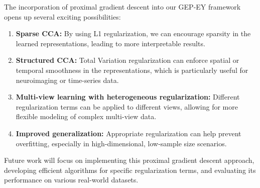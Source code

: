 The incorporation of proximal gradient descent into our GEP-EY framework opens up several exciting possibilities:

\begin{enumerate}
    \item \textbf{Sparse CCA:} By using L1 regularization, we can encourage sparsity in the learned representations, leading to more interpretable results.
    \item \textbf{Structured CCA:} Total Variation regularization can enforce spatial or temporal smoothness in the representations, which is particularly useful for neuroimaging or time-series data.
    \item \textbf{Multi-view learning with heterogeneous regularization:} Different regularization terms can be applied to different views, allowing for more flexible modeling of complex multi-view data.
    \item \textbf{Improved generalization:} Appropriate regularization can help prevent overfitting, especially in high-dimensional, low-sample size scenarios.
\end{enumerate}

Future work will focus on implementing this proximal gradient descent approach, developing efficient algorithms for specific regularization terms, and evaluating its performance on various real-world datasets.





